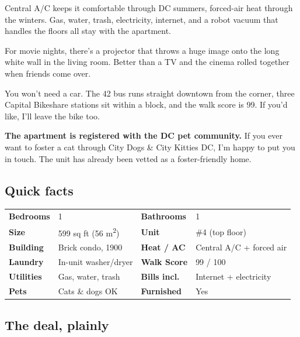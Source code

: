 \documentclass[11pt,a4paper]{article}
\begin{document}
Central A/C keeps it comfortable through DC summers, forced-air heat through the winters. Gas, water, trash, electricity, internet, and a robot vacuum that handles the floors all stay with the apartment.

For movie nights, there's a projector that throws a huge image onto the long white wall in the living room. Better than a TV and the cinema rolled together when friends come over.

You won't need a car. The 42 bus runs straight downtown from the corner, three Capital Bikeshare stations sit within a block, and the walk score is 99. If you'd like, I'll leave the bike too.

\textbf{The apartment is registered with the DC pet community.} If you ever want to foster a cat through City Dogs \& City Kitties DC, I'm happy to put you in touch. The unit has already been vetted as a foster-friendly home.

\subsection*{Quick facts}

\begin{statbox}
\renewcommand{\arraystretch}{1.4}
\begin{tabularx}{\linewidth}{@{}lXlX@{}}
\textbf{Bedrooms} & 1 & \textbf{Bathrooms} & 1 \\
\textbf{Size} & 599 sq ft \textcolor{brandmuted}{(56 m\textsuperscript{2})} & \textbf{Unit} & \#4 \textcolor{brandmuted}{(top floor)} \\
\textbf{Building} & Brick condo, 1900 & \textbf{Heat / AC} & Central A/C + forced air \\
\textbf{Laundry} & In-unit washer/dryer & \textbf{Walk Score} & 99 / 100 \\
\textbf{Utilities} & Gas, water, trash & \textbf{Bills incl.} & Internet + electricity \\
\textbf{Pets} & Cats \& dogs OK & \textbf{Furnished} & Yes \\
\end{tabularx}
\end{statbox}

\subsection*{The deal, plainly}
\end{document}
